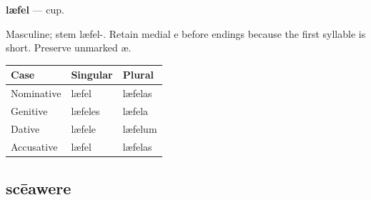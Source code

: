 \par\begin{minipage}{\linewidth}\raggedright
\textbf{læfel} — cup.

Masculine; stem læfel-. Retain medial e before endings because the first syllable is short. Preserve unmarked æ.

\par\begingroup
\fontsize{10.5}{13.2}\selectfont
\setlength{\LTleft}{0pt}\setlength{\LTright}{\fill}
\noindent
\begin{tabular}{@{}>{\raggedright\arraybackslash}p{39.46mm}>{\raggedright\arraybackslash}p{39.46mm}>{\raggedright\arraybackslash}p{39.46mm}@{}}
\toprule
\textbf{Case} & \textbf{Singular} & \textbf{Plural} \\
\midrule
Nominative & læfel & læfelas \\
Genitive & læfeles & læfela \\
Dative & læfele & læfelum \\
Accusative & læfel & læfelas \\
\bottomrule
\end{tabular}
\par\endgroup

\end{minipage}\par
{}
\subsection*{scēawere}

